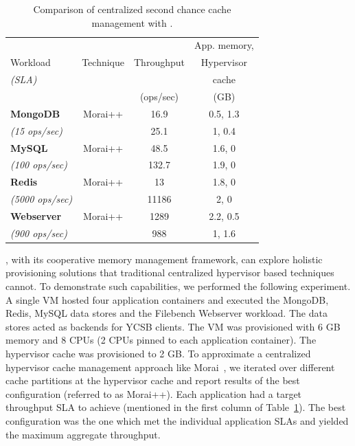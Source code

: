 \begin{table}[t]
\small
\begin{center}
\begin{tabular}{|l|c|c|c|}
\hline
{}           & {} & {} & {App. memory,}\\
{ Workload}  & { Technique} &  Throughput{} & {Hypervisor} \\
{\em (SLA)} & & { } & {cache}  \\
& & { (ops/sec)} & {(GB)}  \\
\hline 
\hline 
{\bf MongoDB} & Morai++ & 16.9 & 0.5, 1.3 \\
{\em (15 ops/sec)} & \dd{}& 25.1 & 1, 0.4  \\
\hline
{\bf MySQL} & Morai++ & 48.5 & 1.6, 0 \\
{\em (100 ops/sec)} & \dd{} & 132.7 & 1.9, 0 \\
\hline
{\bf Redis} & Morai++ & 13 & 1.8, 0 \\
{\em (5000 ops/sec)} & \dd{} & 11186  & 2, 0 \\
\hline
{\bf Webserver} & Morai++ & 1289 & 2.2, 0.5 \\
{\em (900 ops/sec)} & \dd{} & 988 & 1, 1.6  \\
\hline 
\end{tabular}
\caption{Comparison of centralized second chance cache management with \dd{}.}
\vspace{-1cm}
\label{table:ddsdc}
\end{center}
\end{table}
%
\dd{}, with its cooperative memory management framework, can explore 
holistic provisioning solutions that traditional centralized hypervisor
based techniques cannot.
%
To demonstrate such capabilities, we performed the following experiment.
%
A single VM hosted four application containers and executed the 
MongoDB, Redis, MySQL data stores and the Filebench Webserver workload.
The data stores acted as backends for YCSB clients.
The VM was provisioned with 6 GB memory and 8 CPUs (2 CPUs pinned
to each application container).
%
The hypervisor cache was provisioned to 2 GB.
%
To approximate a centralized hypervisor cache management approach 
like Morai~\cite{sdc},
we iterated over different cache partitions at the hypervisor 
cache and report
results of the best configuration (referred to as Morai++).
%
Each application had a target throughput SLA to achieve (mentioned
in the first column of Table~\ref{table:ddsdc}). The best configuration
was the one which met the individual application SLAs and yielded
the maximum aggregate throughput.
%
% 

